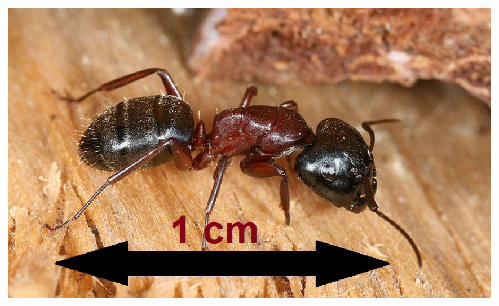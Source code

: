 \documentclass{beamer}
\begin{document}
\begin{frame}
\begin{columns}[T]
\begin{column}{0.75\textwidth}
\begin{columns}
\begin{column}{0.35\textwidth}
{            \includegraphics[width=\textwidth]{matter/AmeiseMitMassstab.png}
          }
        \end{column}
        \begin{column}{0.1\textwidth}
        \end{column}
      \end{columns}
    \end{column}
  \end{columns}
\end{frame}
\end{document}

